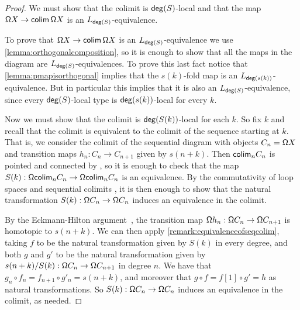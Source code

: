\begin{proof}
    We must show that the colimit is $\mathsf{deg}(S)$-local and that
    the map $\mathsf{\Omega} X \to \mathsf{colim}\, \mathsf{\Omega} X$ is an $L_{\mathsf{deg}(S)}$-equivalence.
    
    To prove that $\mathsf{\Omega} X \to \mathsf{colim}\, \mathsf{\Omega} X$ is an $L_{\mathsf{deg}(S)}$-equivalence
    we use \cref{lemma:orthogonalcomposition}, so it is enough to show that all the maps in the
    diagram are $L_{\mathsf{deg}(S)}$-equivalences. To prove this last fact notice that \cref{lemma:pmapisorthogonal}
    implies that the $s(k)$-fold map is an $L_{\mathsf{deg}(s(k))}$-equivalence. But in particular this implies that it is also an
    $L_{\mathsf{deg}(S)}$-equivalence, since every $\mathsf{deg}(S)$-local type is $\mathsf{deg}(s(k))$-local for every $k$.

    Now we must show that the colimit is $\mathsf{deg}(S(k))$-local for each $k$.
    So fix $k$ and recall that
    the colimit is equivalent to the colimit of the sequence starting at $k$.
    That is, we consider the colimit of the sequential diagram with objects
    $C_n = \mathsf{\Omega} X$ and transition maps $h_n : C_n \to C_{n+1}$ given by $s(n+k)$.
    Then $\mathsf{colim}_n C_n$ is pointed and connected by \cite{DoornRijkeSojakova},
    so it is enough to check that the map $S(k) : \mathsf{\Omega} \mathsf{colim}_n C_n \to \mathsf{\Omega} \mathsf{colim}_n C_n$ is an equivalence.
    By the commutativity of loop spaces and sequential colimits \cite{DoornRijkeSojakova},
    it is then enough to show that the natural transformation $S(k) : \mathsf{\Omega} C_n \to \mathsf{\Omega} C_n$
    induces an equivalence in the colimit.

    By the Eckmann-Hilton argument~\cite[Theorem~2.1.6]{hottbook}, the transition map
    $\mathsf{\Omega} h_n : \mathsf{\Omega} C_n \to \mathsf{\Omega} C_{n+1}$ is homotopic to $s(n+k)$.
    We can then apply \cref{remark:equivalenceofseqcolim},
    taking $f$ to be the natural transformation given by
    $S(k)$ in every degree, and both $g$ and $g'$ to be the natural transformation given by
    $s(n + k)/S(k) : \mathsf{\Omega} C_n \to \mathsf{\Omega} C_{n+1}$ in degree $n$.
    We have that $g_n \circ f_n = f_{n+1} \circ g'_n = s(n + k)$, and moreover that
    $g \circ f = f[1] \circ g' = h$ as natural transformations.
    So $S(k) : \mathsf{\Omega} C_n \to \mathsf{\Omega} C_n$ induces an equivalence in the colimit,
    as needed.
\end{proof}

